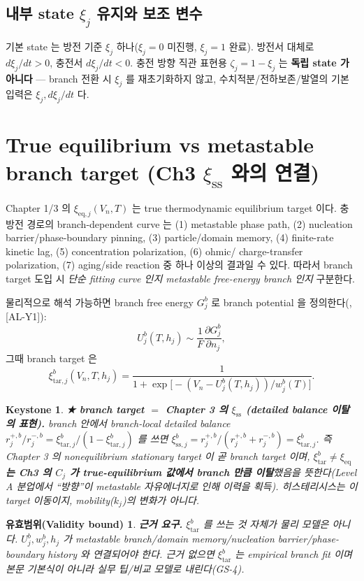 \documentclass[11pt,a4paper]{article}
\newtheorem*{boundbox}{유효범위(Validity bound)}
\newtheorem*{keybox}{Keystone}
\newcommand{\eq}{\mathrm{eq}}
\newcommand{\tar}{\mathrm{tar}}
\newcommand{\sstat}{\mathrm{ss}}
\newcommand{\AL}[1]{\textsf{[AL-#1]}}
\begin{document}
\subsection{내부 state $\xi_j$ 유지와 보조 변수}
기본 state 는 방전 기준 $\xi_j$ 하나($\xi_j=0$ 미진행, $\xi_j=1$ 완료). 방전서 대체로 $d\xi_j/dt>0$, 충전서
$d\xi_j/dt<0$. 충전 방향 직관 표현용 $\zeta_j=1-\xi_j$ 는 \textbf{독립 state 가 아니다} — branch 전환 시
$\xi_j$ 를 재초기화하지 않고, 수치적분/전하보존/발열의 기본 입력은 $\xi_j,d\xi_j/dt$ 다.

\section{True equilibrium vs metastable branch target (Ch3 $\xi_{\sstat}$ 와의 연결)}\label{sec:ch5_branch}
Chapter 1/3 의 $\xi_{\eq,j}(V_n,T)$ 는 true thermodynamic equilibrium target 이다. 충방전 경로의
branch-dependent curve 는 (1) metastable phase path, (2) nucleation barrier/phase-boundary pinning,
(3) particle/domain memory, (4) finite-rate kinetic lag, (5) concentration polarization, (6) ohmic/
charge-transfer polarization, (7) aging/side reaction 중 하나 이상의 결과일 수 있다. 따라서 branch target
도입 시 \emph{단순 fitting curve 인지 metastable free-energy branch 인지} 구분한다.

물리적으로 해석 가능하면 branch free energy $G_j^b$ 로 branch potential 을 정의한다(\cite{dreyer2010,sethna1993}, \AL{Y1}):
\begin{equation}
U_j^b(T,h_j)\sim\frac{1}{F}\frac{\partial G_j^b}{\partial n_j},
\label{eq:ch5_branch_potential}
\end{equation}
그때 branch target 은
\begin{equation}
\xi_{\tar,j}^b(V_n,T,h_j)=\frac{1}{1+\exp\!\big[-(V_n-U_j^b(T,h_j))/w_j^b(T)\big]}.
\label{eq:ch5_branch_target}
\end{equation}
\begin{keybox}
\textbf{★ branch target $=$ Chapter 3 의 $\xi_{\sstat}$ (detailed balance 이탈의 표현).} branch 안에서
branch-local detailed balance $r_j^{+,b}/r_j^{-,b}=\xi_{\tar,j}^b/(1-\xi_{\tar,j}^b)$ 를 쓰면
$\xi_{\sstat,j}^b=r_j^{+,b}/(r_j^{+,b}+r_j^{-,b})=\xi_{\tar,j}^b$. 즉 Chapter 3 의 nonequilibrium stationary
target 이 곧 branch target 이며, \textbf{$\xi_{\tar}^b\ne\xi_{\eq}$ 는 Ch3 의 $C_j$ 가 true-equilibrium
값에서 branch 만큼 이탈}했음을 뜻한다(Level A 분업에서 ``방향''이 metastable 자유에너지로 인해 이력을
획득). 히스테리시스는 이 \emph{target 이동}이지, mobility($k_j$)의 변화가 아니다.
\end{keybox}
\begin{boundbox}
\textbf{근거 요구.} $\xi_{\tar}^b$ 를 쓰는 것 자체가 물리 모델은 아니다. $U_j^b,w_j^b,h_j$ 가 metastable
branch/domain memory/nucleation barrier/phase-boundary history 와 연결되어야 한다. 근거 없으면 $\xi_{\tar}^b$
는 empirical branch fit 이며 본문 기본식이 아니라 실무 팁/비교 모델로 내린다(GS-4).
\end{boundbox}
\end{document}
